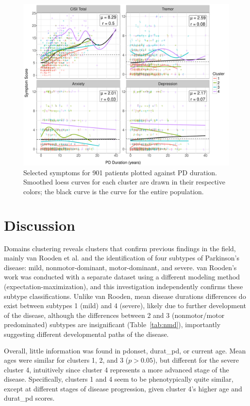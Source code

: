 \documentclass[preprint,5p]{elsarticle} %
\begin{document}
\begin{figure}[p]
  \centering
  \includegraphics[width=0.8\linewidth]{long4-d.pdf}
  \caption{Selected symptoms for 901 patients plotted against PD duration. Smoothed loess curves for each cluster
  are drawn in their respective colors; the black curve is the curve for the entire population.}
  \label{fig:long4}
\end{figure}

\section{Discussion}

Domains clustering reveals clusters that confirm previous
findings in the field, mainly van Rooden et al.\cite{vanrooden10} and the identification of four
subtypes of Parkinson's disease: mild, nonmotor-dominant, motor-dominant, and severe. van
Rooden's work was conducted with a separate dataset using a different modeling method
(expectation-maximization), and this investigation independently confirms these subtype
classifications. Unlike van Rooden, mean disease durations differences do exist between subtypes 1
(mild) and 4 (severe), likely due to further development of the disease, although the differences
between 2 and 3 (nonmotor/motor predominated) subtypes are insignificant
(Table~\ref{tab:nmd}), importantly suggesting different developmental paths of the disease.

Overall, little information was found in pdonset,
durat\_pd, or current age. Mean ages were similar for clusters 1, 2, and 3 ($p >
0.05$), but different for the severe cluster 4, intuitively since cluster 4 represents a more
advanced stage of the disease.  Specifically, clusters 1 and 4 seem to be phenotypically quite
similar, except at different stages of disease progression, given cluster 4's higher age and
durat\_pd scores.
\end{document}
